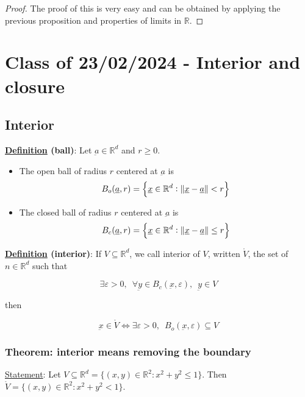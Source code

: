 \documentclass[10pt]{extarticle}
\newcommand{\R}{\mathbb{R}}
\newcommand{\munderbar}[1]{\underbar{\ensuremath{#1}}}
\begin{document}
\begin{proof}
    The proof of this is very easy and can be obtained by applying the previous proposition and properties of limits in $\R$.
\end{proof}

\section{Class of 23/02/2024 - Interior and closure}

\subsection{Interior}

\textbf{\underline{Definition} (ball)}:
Let $\munderbar{a} \in \R^d$ and $r \geq 0$.
\begin{itemize}
    \item The open ball of radius $r$ centered at $\munderbar{a}$ is
          $$
              B_o(\munderbar{a}, r) = \left\{ \munderbar{x} \in \R^d : \norm{\munderbar{x} - \munderbar{a}} < r \right\}
          $$
    \item The closed ball of radius $r$ centered at $\munderbar{a}$ is
          $$
              B_c(\munderbar{a}, r) = \left\{ \munderbar{x} \in \R^d : \norm{\munderbar{x} - \munderbar{a}} \leq r \right\}
          $$
\end{itemize}

\textbf{\underline{Definition} (interior)}:
If $V \subseteq \R^d$, we call interior of $V$, written $\mathring{V}$, the set of $n \in \R^d$ such that

$$
    \exists \varepsilon > 0, \enspace
    \forall \munderbar{y} \in B_c(\munderbar{x}, \varepsilon), \enspace
    \munderbar{y} \in V
$$

then

$$
    \munderbar{x} \in \mathring{V} \iff \exists \varepsilon > 0, \enspace
    B_o(\munderbar{x}, \varepsilon) \subseteq V
$$

\subsubsection{Theorem: interior means removing the boundary}

\underline{Statement}: Let $V \subseteq \R^d = \{ (x, y) \in \R^2 : x^2 + y^2 \leq 1 \}$.
Then $\mathring{V} = \{ (x, y) \in \R^2 : x^2 + y^2 < 1 \}$.
\end{document}
